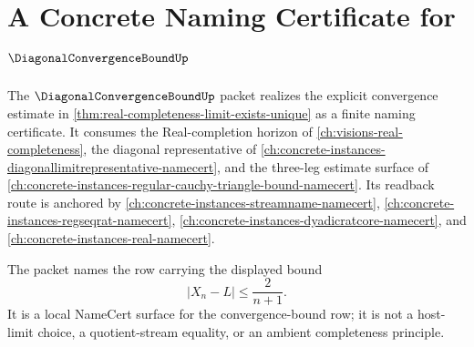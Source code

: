\chapter{A Concrete Naming Certificate for $\DiagonalConvergenceBoundUp$}
\label{ch:concrete-instances-diagonalconvergencebound-namecert}

The $\DiagonalConvergenceBoundUp$ packet realizes the explicit convergence estimate in \autoref{thm:real-completeness-limit-exists-unique} as a finite naming certificate. It consumes the Real-completion horizon of \autoref{ch:visions-real-completeness}, the diagonal representative of \autoref{ch:concrete-instances-diagonallimitrepresentative-namecert}, and the three-leg estimate surface of \autoref{ch:concrete-instances-regular-cauchy-triangle-bound-namecert}. Its readback route is anchored by \autoref{ch:concrete-instances-streamname-namecert}, \autoref{ch:concrete-instances-regseqrat-namecert}, \autoref{ch:concrete-instances-dyadicratcore-namecert}, and \autoref{ch:concrete-instances-real-namecert}.

The packet names the row carrying the displayed bound
$$
|X_n-L| \leq \frac{2}{n+1}.
$$
It is a local NameCert surface for the convergence-bound row; it is not a host-limit choice, a quotient-stream equality, or an ambient completeness principle.

